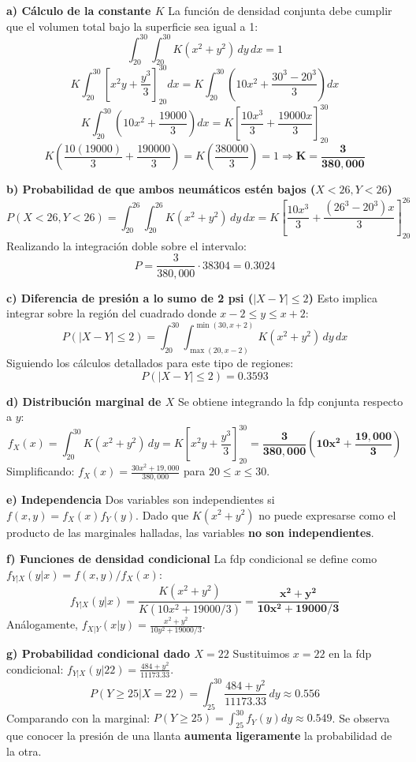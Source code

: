 \documentclass[a4paper]{article}
\begin{document}
\textbf{a) Cálculo de la constante $K$}
La función de densidad conjunta debe cumplir que el volumen total bajo la superficie sea igual a 1:
$$\int_{20}^{30} \int_{20}^{30} K(x^2 + y^2) \, dy \, dx = 1$$
$$K \int_{20}^{30} \left[ x^2y + \frac{y^3}{3} \right]_{20}^{30} dx = K \int_{20}^{30} \left( 10x^2 + \frac{30^3 - 20^3}{3} \right) dx$$
$$K \int_{20}^{30} \left( 10x^2 + \frac{19000}{3} \right) dx = K \left[ \frac{10x^3}{3} + \frac{19000x}{3} \right]_{20}^{30}$$
$$K \left( \frac{10(19000)}{3} + \frac{190000}{3} \right) = K \left( \frac{380000}{3} \right) = 1 \Rightarrow \mathbf{K = \frac{3}{380,000}}$$

\textbf{b) Probabilidad de que ambos neumáticos estén bajos ($X < 26, Y < 26$)}
$$P(X < 26, Y < 26) = \int_{20}^{26} \int_{20}^{26} K(x^2 + y^2) \, dy \, dx = K \left[ \frac{10x^3}{3} + \frac{(26^3-20^3)x}{3} \right]_{20}^{26}$$
Realizando la integración doble sobre el intervalo:
$$P = \frac{3}{380,000} \cdot 38304 = \mathbf{0.3024}$$

\textbf{c) Diferencia de presión a lo sumo de 2 psi ($|X - Y| \le 2$)}
Esto implica integrar sobre la región del cuadrado donde $x-2 \le y \le x+2$:
$$P(|X - Y| \le 2) = \int_{20}^{30} \int_{\max(20, x-2)}^{\min(30, x+2)} K(x^2 + y^2) \, dy \, dx$$
Siguiendo los cálculos detallados para este tipo de regiones:
$$P(|X - Y| \le 2) = \mathbf{0.3593}$$

\textbf{d) Distribución marginal de $X$}
Se obtiene integrando la fdp conjunta respecto a $y$:
$$f_X(x) = \int_{20}^{30} K(x^2 + y^2) \, dy = K \left[ x^2y + \frac{y^3}{3} \right]_{20}^{30} = \mathbf{\frac{3}{380,000} \left( 10x^2 + \frac{19,000}{3} \right)}$$
Simplificando: $f_X(x) = \frac{30x^2 + 19,000}{380,000}$ para $20 \le x \le 30$.

\textbf{e) Independencia}
Dos variables son independientes si $f(x, y) = f_X(x)f_Y(y)$. Dado que $K(x^2 + y^2)$ no puede expresarse como el producto de las marginales halladas, las variables \textbf{no son independientes}.

\textbf{f) Funciones de densidad condicional}
La fdp condicional se define como $f_{Y|X}(y|x) = f(x, y) / f_X(x)$:
$$f_{Y|X}(y|x) = \frac{K(x^2 + y^2)}{K(10x^2 + 19000/3)} = \mathbf{\frac{x^2 + y^2}{10x^2 + 19000/3}}$$
Análogamente, $f_{X|Y}(x|y) = \frac{x^2 + y^2}{10y^2 + 19000/3}$.

\textbf{g) Probabilidad condicional dado $X = 22$}
Sustituimos $x = 22$ en la fdp condicional: $f_{Y|X}(y|22) = \frac{484 + y^2}{11173.33}$.
$$P(Y \ge 25 | X = 22) = \int_{25}^{30} \frac{484 + y^2}{11173.33} \, dy \approx \mathbf{0.556}$$
Comparando con la marginal: $P(Y \ge 25) = \int_{25}^{30} f_Y(y) dy \approx \mathbf{0.549}$.
Se observa que conocer la presión de una llanta \textbf{aumenta ligeramente} la probabilidad de la otra.
\end{document}
